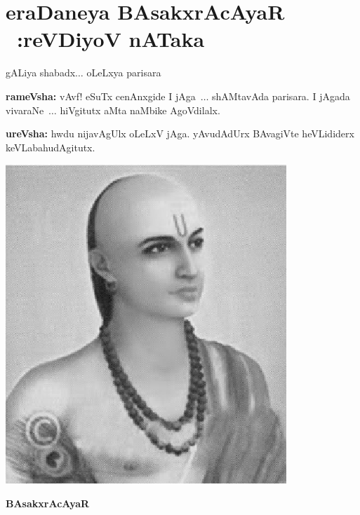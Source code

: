 \chapter[eraDaneya BAsakxrAcAyaR : reVDiyoV nATaka]{eraDaneya BAsakxrAcAyaR ~:\break  reVDiyoV nATaka}

\begin{minipage}[l]{6.5cm}
\qquad gALiya shabadx$\ldots$ oLeLxya parisara

\smallskip

\smallskip

{\bf rameVsha:} vAvf! eSuTx cenAnxgide I jAga~$\ldots$ shAMtavAda parisara. I jAgada vivaraNe~$\ldots$ hiVgitutx aMta naMbike AgoVdilalx.

\medskip
\smallskip

{\bf ureVsha:} hwdu nijavAgUlx oLeLxV jAga. yAvudAdUrx BAvagiVte heVLididerx keVLabahudAgitutx.

\medskip
\medskip
\end{minipage}
\begin{minipage}[l]{4cm}
  \centering\includegraphics[scale=0.8]{src/figures/bhaskaracharya-II.eps}
  
  {\bf BAsakxrAcAyaR}
    \end{minipage}
        
